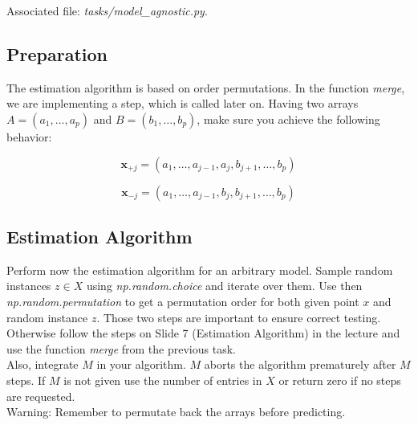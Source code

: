 \documentclass[a4paper]{article}
\begin{document}
\noindent Associated file: \textit{tasks/model\_agnostic.py}.

\subsection{Preparation}

The estimation algorithm is based on order permutations. In the function \textit{merge}, we are implementing a step, which is called later on. Having two arrays $A = (a_1, \ldots, a_p)$ and $B = (b_1, \ldots, b_p)$, make sure you achieve the following behavior:

\begin{equation}
    \mathbf{x}_{+j} = (a_1, \ldots, a_{j-1}, a_j, b_{j+1}, \ldots, b_{p})
\end{equation}

\begin{equation}
    \mathbf{x}_{-j} = (a_1, \ldots, a_{j-1}, b_j, b_{j+1}, \ldots, b_{p})
\end{equation}


\subsection{Estimation Algorithm}

Perform now the estimation algorithm for an arbitrary model. Sample random instances $z \in X$ using \textit{np.random.choice} and iterate over them. Use then \textit{np.random.permutation} to get a permutation order for both given point $x$ and random instance $z$. Those two steps are important to ensure correct testing. Otherwise follow the steps on Slide 7 (Estimation Algorithm) in the lecture and use the function \textit{merge} from the previous task.\\

\noindent Also, integrate $M$ in your algorithm. $M$ aborts the algorithm prematurely after $M$ steps. If $M$ is not given use the number of entries in $X$ or return zero if no steps are requested.\\

\noindent Warning: Remember to permutate back the arrays before predicting.
\end{document}
